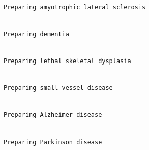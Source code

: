 \documentclass[
]{agujournal2019}
\begin{document}
\begin{verbatim}

Preparing amyotrophic lateral sclerosis 
\end{verbatim}

\begin{verbatim}

Preparing dementia 
\end{verbatim}

\begin{verbatim}

Preparing lethal skeletal dysplasia 
\end{verbatim}

\begin{verbatim}

Preparing small vessel disease 
\end{verbatim}

\begin{verbatim}

Preparing Alzheimer disease 
\end{verbatim}

\begin{verbatim}

Preparing Parkinson disease 
\end{verbatim}
\end{document}
